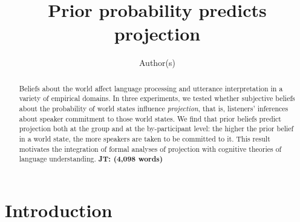 \documentclass[11pt,fleqn]{article}
\title{Prior probability predicts projection}
\author{Author(s)}
\newcommand{\jt}[1]{\textbf{\color{blue}JT: #1}}
\newcommand{\6}{\mbox{$[\hspace*{-.6mm}[$}}
\newcommand{\9}{\mbox{$]\hspace*{-.6mm}]$}}
\begin{document}

\maketitle

\begin{abstract}

Beliefs about the world affect language processing and utterance interpretation in a variety of empirical domains. In three experiments, we tested whether subjective beliefs about the probability of world states influence \emph{projection}, that is, listeners' inferences about speaker commitment to those world states. We find that prior beliefs predict projection both at the group and at the by-participant level: the higher the prior belief in a world state, the more speakers are taken to be committed to it. This result motivates the integration of formal analyses of projection with cognitive theories of language understanding.  \jt{(4,098 words)}

\end{abstract}


\section{Introduction}
\end{document}

